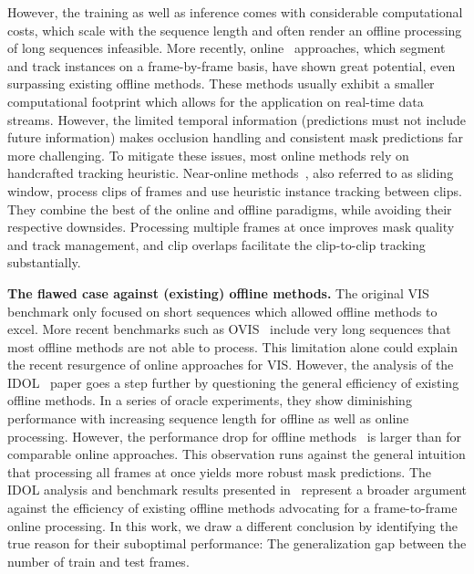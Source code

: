 \documentclass{article}
\theoremstyle{plain}
\theoremstyle{definition}
\theoremstyle{remark}
\begin{document}
However, the training as well as inference comes with considerable computational costs, which scale with the sequence length and often render an offline processing of long sequences infeasible.
More recently, online~\cite{IDOL, huang2022minvis} approaches, which segment and track instances on a frame-by-frame basis, have shown great potential, even surpassing existing offline methods.
These methods usually exhibit a smaller computational footprint which allows for the application on real-time data streams.
However, the limited temporal information (predictions must not include future information) makes occlusion handling and consistent mask predictions far more challenging.
To mitigate these issues, most online methods rely on handcrafted tracking heuristic.
Near-online methods~\cite{mask_prop,stem_seg,devis,IFC}, also referred to as sliding window, process clips of frames and use heuristic instance tracking between clips.
They combine the best of the online and offline paradigms, while avoiding their respective downsides.
Processing multiple frames at once improves mask quality and track management, and clip overlaps facilitate the clip-to-clip tracking substantially.


\noindent \textbf{The flawed case against (existing) offline methods.}
The original VIS benchmark only focused on short sequences which allowed offline methods to excel.
More recent benchmarks such as OVIS~\cite{ovis} include very long sequences that most offline methods are not able to process.
This limitation alone could explain the recent resurgence of online approaches for VIS.
However, the analysis of the IDOL~\cite{IDOL} paper goes a step further by questioning the general efficiency of existing offline methods.
In a series of oracle experiments, they show diminishing performance with increasing sequence length for offline as well as online processing.
However, the performance drop for offline methods~\cite{seqformer, IFC} is larger than for comparable online approaches.
This observation runs against the general intuition that processing all frames at once yields more robust mask predictions.
The IDOL analysis and benchmark results presented in~\cite{IDOL, huang2022minvis} represent a broader argument against the efficiency of existing offline methods advocating for a frame-to-frame online processing.
In this work, we draw a different conclusion by identifying the true reason for their suboptimal performance: The generalization gap between the number of train and test frames.
\end{document}
